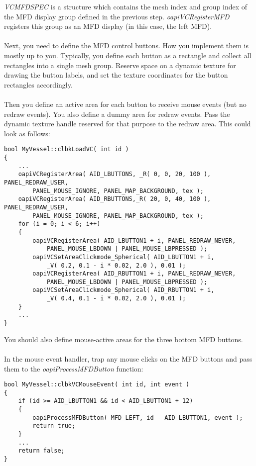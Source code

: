 \documentclass[Orbiter Developer Manual.tex]{subfiles}
\begin{document}
\noindent
\textit{VCMFDSPEC} is a structure which contains the mesh index and group index of the MFD display group defined in the previous step. \textit{oapiVCRegisterMFD} registers this group as an MFD display (in this case, the left MFD).\\
\\
Next, you need to define the MFD control buttons. How you implement them is mostly up to you. Typically, you define each button as a rectangle and collect all rectangles into a single mesh group. Reserve space on a dynamic texture for drawing the button labels, and set the texture coordinates for the button rectangles accordingly.\\
\\
Then you define an active area for each button to receive mouse events (but no redraw events). You also define a dummy area for redraw events. Pass the dynamic texture handle reserved for that purpose to the redraw area. This could look as follows:

\begin{lstlisting}
bool MyVessel::clbkLoadVC( int id )
{
	...
	oapiVCRegisterArea( AID_LBUTTONS, _R( 0, 0, 20, 100 ), PANEL_REDRAW_USER,
		PANEL_MOUSE_IGNORE, PANEL_MAP_BACKGROUND, tex );
	oapiVCRegisterArea( AID_RBUTTONS,_R( 20, 0, 40, 100 ), PANEL_REDRAW_USER,
		PANEL_MOUSE_IGNORE, PANEL_MAP_BACKGROUND, tex );
	for (i = 0; i < 6; i++)
	{
		oapiVCRegisterArea( AID_LBUTTON1 + i, PANEL_REDRAW_NEVER,
			PANEL_MOUSE_LBDOWN | PANEL_MOUSE_LBPRESSED );
		oapiVCSetAreaClickmode_Spherical( AID_LBUTTON1 + i,
			_V( 0.2, 0.1 - i * 0.02, 2.0 ), 0.01 );
		oapiVCRegisterArea( AID_RBUTTON1 + i, PANEL_REDRAW_NEVER,
			PANEL_MOUSE_LBDOWN | PANEL_MOUSE_LBPRESSED );
		oapiVCSetAreaClickmode_Spherical( AID_RBUTTON1 + i,
			_V( 0.4, 0.1 - i * 0.02, 2.0 ), 0.01 );
	}
	...
}
\end{lstlisting}

\noindent
You should also define mouse-active areas for the three bottom MFD buttons.\\
\\
In the mouse event handler, trap any mouse clicks on the MFD buttons and pass them to the \textit{oapiProcessMFDButton} function:

\begin{lstlisting}
bool MyVessel::clbkVCMouseEvent( int id, int event )
{
	if (id >= AID_LBUTTON1 && id < AID_LBUTTON1 + 12)
	{
		oapiProcessMFDButton( MFD_LEFT, id - AID_LBUTTON1, event );
		return true;
	}
	...
	return false;
}
\end{lstlisting}
\end{document}
